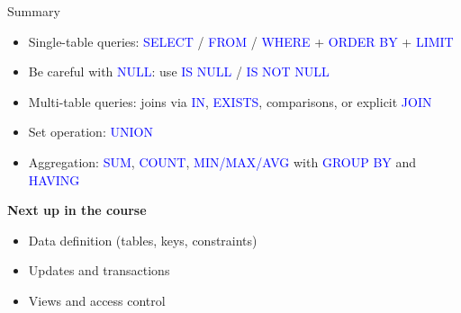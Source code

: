 \documentclass[10pt,aspectratio=169]{beamer}
\newcommand{\sqlk}[1]{\textcolor{blue}{#1}}
\begin{document}
\begin{frame}{Summary}
\begin{itemize}
  \item Single-table queries: \sqlk{SELECT} / \sqlk{FROM} / \sqlk{WHERE} + \sqlk{ORDER BY} + \sqlk{LIMIT}
  \item Be careful with \sqlk{NULL}: use \sqlk{IS NULL} / \sqlk{IS NOT NULL}
  \item Multi-table queries: joins via \sqlk{IN}, \sqlk{EXISTS}, comparisons, or explicit \sqlk{JOIN}
  \item Set operation: \sqlk{UNION}
  \item Aggregation: \sqlk{SUM}, \sqlk{COUNT}, \sqlk{MIN/MAX/AVG} with \sqlk{GROUP BY} and \sqlk{HAVING}
\end{itemize}
\end{frame}

\begin{frame}[plain]
\vfill
\centering
{\Large \textbf{Next up in the course}}\\[0.8em]
\begin{itemize}
  \item Data definition (tables, keys, constraints)
  \item Updates and transactions
  \item Views and access control
\end{itemize}
\vfill
\end{frame}
\end{document}
